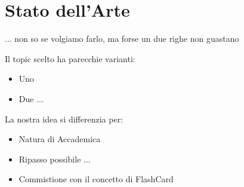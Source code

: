 

\chapter{Stato dell'Arte}
 ... non so se volgiamo farlo, ma forse un due righe non guastano
 
Il topic scelto ha parecchie varianti:

\begin{itemize}
    \item Uno
    \item Due ...
\end{itemize}
 
La nostra idea si differenzia per: 

\begin{itemize}
    \item Natura di Accademica
    \item Ripasso possibile ...
    \item Commistione con il concetto di FlashCard
\end{itemize}